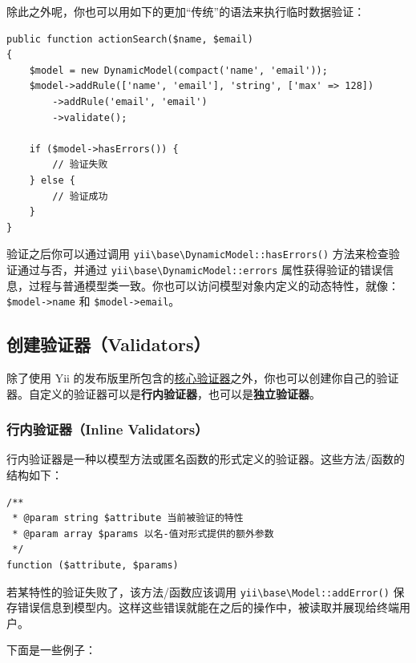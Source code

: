 除此之外呢，你也可以用如下的更加“传统”的语法来执行临时数据验证：

\lstset{language=php}\begin{lstlisting}
public function actionSearch($name, $email)
{
    $model = new DynamicModel(compact('name', 'email'));
    $model->addRule(['name', 'email'], 'string', ['max' => 128])
        ->addRule('email', 'email')
        ->validate();

    if ($model->hasErrors()) {
        // 验证失败
    } else {
        // 验证成功
    }
}
\end{lstlisting}
验证之后你可以通过调用 \texttt{yii{\allowbreak{}\textbackslash}base{\allowbreak{}\textbackslash}DynamicModel\allowbreak{}::\allowbreak{}hasErrors()}
方法来检查验证通过与否，并通过 \texttt{yii{\allowbreak{}\textbackslash}base{\allowbreak{}\textbackslash}DynamicModel\allowbreak{}::\allowbreak{}errors}
属性获得验证的错误信息，过程与普通模型类一致。你也可以访问模型对象内定义的动态特性，就像：
\lstinline|$model->name| 和 \lstinline|$model->email|。

\subsection{创建验证器（Validators） \label{input-validation.md::creating-validators}}
除了使用 Yii 的发布版里所包含的\hyperref[tutorial-core-validators.md]{核心验证器}之外，你也可以创建你自己的验证器。自定义的验证器可以是\textbf{行内验证器}，也可以是\textbf{独立验证器}。

\subsubsection{行内验证器（Inline Validators） \label{input-validation.md::inline-validators}}
行内验证器是一种以模型方法或匿名函数的形式定义的验证器。这些方法/函数的结构如下：

\lstset{language=php}\begin{lstlisting}
/**
 * @param string $attribute 当前被验证的特性
 * @param array $params 以名-值对形式提供的额外参数
 */
function ($attribute, $params)
\end{lstlisting}
若某特性的验证失败了，该方法/函数应该调用 \texttt{yii{\allowbreak{}\textbackslash}base{\allowbreak{}\textbackslash}Model\allowbreak{}::\allowbreak{}addError()} 保存错误信息到模型内。这样这些错误就能在之后的操作中，被读取并展现给终端用户。

下面是一些例子：

